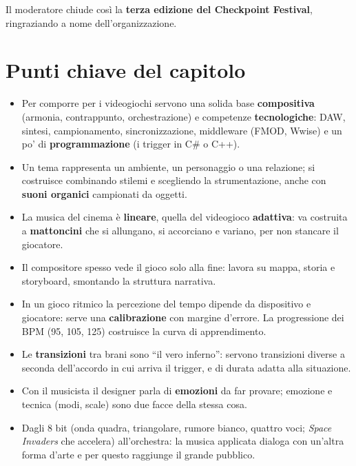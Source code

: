 Il moderatore chiude così la \textbf{terza edizione del Checkpoint Festival},
ringraziando a nome dell'organizzazione.

\section*{Punti chiave del capitolo}

\begin{itemize}
  \item Per comporre per i videogiochi servono una solida base
        \textbf{compositiva} (armonia, contrappunto, orchestrazione) e competenze
        \textbf{tecnologiche}: DAW, sintesi, campionamento, sincronizzazione,
        middleware (FMOD, Wwise) e un po' di \textbf{programmazione} (i trigger
        in C\# o C++).
  \item Un tema rappresenta un ambiente, un personaggio o una relazione; si
        costruisce combinando stilemi e scegliendo la strumentazione, anche con
        \textbf{suoni organici} campionati da oggetti.
  \item La musica del cinema è \textbf{lineare}, quella del videogioco
        \textbf{adattiva}: va costruita a \textbf{mattoncini} che si allungano,
        si accorciano e variano, per non stancare il giocatore.
  \item Il compositore spesso vede il gioco solo alla fine: lavora su mappa,
        storia e storyboard, smontando la struttura narrativa.
  \item In un gioco ritmico la percezione del tempo dipende da dispositivo e
        giocatore: serve una \textbf{calibrazione} con margine d'errore. La
        progressione dei BPM (95, 105, 125) costruisce la curva di
        apprendimento.
  \item Le \textbf{transizioni} tra brani sono ``il vero inferno'': servono
        transizioni diverse a seconda dell'accordo in cui arriva il trigger, e di
        durata adatta alla situazione.
  \item Con il musicista il designer parla di \textbf{emozioni} da far provare;
        emozione e tecnica (modi, scale) sono due facce della stessa cosa.
  \item Dagli 8 bit (onda quadra, triangolare, rumore bianco, quattro voci;
        \emph{Space Invaders} che accelera) all'orchestra: la musica applicata
        dialoga con un'altra forma d'arte e per questo raggiunge il grande
        pubblico.
\end{itemize}
